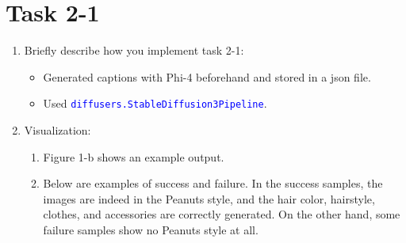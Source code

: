 \documentclass{article}
\begin{document}
\section*{Task 2-1}
\begin{enumerate}
	\item Briefly describe how you implement task 2-1:
		\begin{itemize}
			\item Generated captions with Phi-4 beforehand and stored in a json file.
			\item Used \textcolor{blue}{\texttt{diffusers.StableDiffusion3Pipeline}}.
		\end{itemize}
	\item Visualization:
		\begin{enumerate}
			\item Figure 1-b shows an example output.
			\item Below are examples of success and failure. In the success samples, the images are indeed in the Peanuts style, and the hair color, hairstyle, clothes, and accessories are correctly generated. On the other hand, some failure samples show no Peanuts style at all.
				\begin{figure}[h!]
					\centering
					\begin{minipage}{0.8\textwidth}
						\centering


\end{minipage}
\end{figure}
\end{enumerate}
\end{enumerate}
\end{document}
